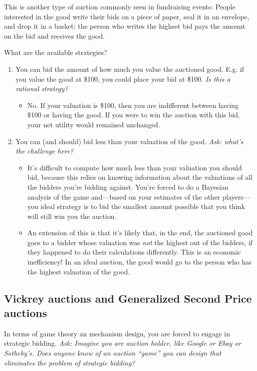 \documentclass[11pt]{article}
\begin{document}
This is another type of auction commonly seen in fundraising events: People interested in the good write their bids on a piece of paper, seal it in an envelope, and drop it in a basket; the person who writes the highest bid pays the amount on the bid and receives the good.

What are the available strategies? 
\begin{enumerate}
    \item You can bid the amount of how much you value the auctioned good. E.g. if you value the good at \$100, you could place your bid at \$100. {\it Is this a rational strategy?}
    \begin{itemize}
        \item No. If your valuation is \$100, then you are indifferent between having \$100 or having the good. If you were to win the auction with this bid, your net utility would remained unchanged.
    \end{itemize}
    \item You can (and should) bid less than your valuation of the good. {\it Ask: what's the challenge here?}
    \begin{itemize}
        \item It's difficult to compute how much less than your valuation you should bid, because this relies on knowing information about the valuations of all the bidders you're bidding against. You're forced to do a Bayesian analysis of the game and---based on your estimates of the other players---you ideal strategy is to bid the smallest amount possible that you think will still win you the auction.
        \item An extension of this is that it's likely that, in the end, the auctioned good goes to a bidder whose valuation was {\it not} the highest out of the bidders, if they happened to do their calculations differently. This is an economic inefficiency! In an ideal auction, the good would go to the person who has the highest valuation of the good.
    \end{itemize}
\end{enumerate}

\subsection{Vickrey auctions and Generalized Second Price auctions}

In terms of game theory an mechanism design, you are forced to engage in strategic bidding. {\it Ask: Imagine you are auction holder, like Google or Ebay or Sotheby's. Does anyone know of an auction ``game'' you can design that eliminates the problem of strategic bidding?}
\end{document}
